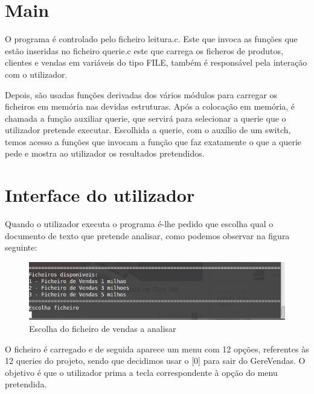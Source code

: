 \chapter{Main}

O programa é controlado pelo ficheiro leitura.c. Este que invoca as funções que estão inseridas no ficheiro querie.c este que carrega os ficheros de produtos, clientes e vendas em variáveis do tipo FILE,  também é responsável pela interação com o utilizador.


 
Depois, são usadas funções derivadas dos vários módulos para carregar os ficheiros em memória nas devidas estruturas. Após a colocação em memória, é chamada a função auxiliar querie, que servirá para selecionar a querie que o utilizador pretende executar. Escolhida a querie, com o auxílio de um switch, temos acesso a funções que invocam a função que faz exatamente o que a querie pede e mostra ao utilizador os resultados pretendidos.


\chapter{Interface do utilizador}
Quando o utilizador executa o programa é-lhe pedido que escolha qual o documento de texto que pretende analisar, como podemos observar na figura seguinte: 

\begin{figure}[h!]
	\centering
	\includegraphics[scale=0.4]{1querie.png}  
	\caption{Escolha do ficheiro de vendas a analisar}  
\end{figure}

O ficheiro é carregado e de seguida aparece um menu com 12 opções, referentes às 12 queries do projeto, sendo que decidimos usar o [0] para sair do GereVendas. O objetivo é que o utilizador prima a tecla correspondente à opção do menu pretendida.

